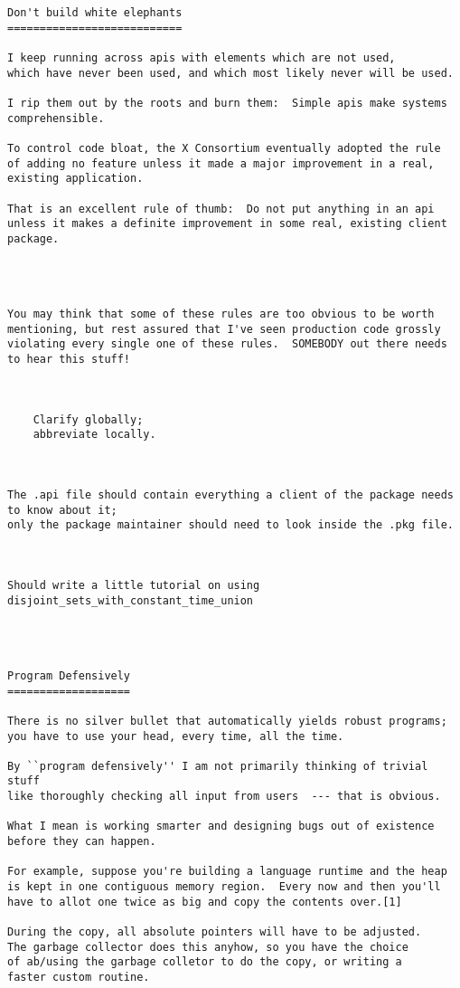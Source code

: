 \begin{verbatim}
Don't build white elephants 
=========================== 

I keep running across apis with elements which are not used, 
which have never been used, and which most likely never will be used. 

I rip them out by the roots and burn them:  Simple apis make systems comprehensible. 

To control code bloat, the X Consortium eventually adopted the rule 
of adding no feature unless it made a major improvement in a real, 
existing application. 

That is an excellent rule of thumb:  Do not put anything in an api 
unless it makes a definite improvement in some real, existing client 
package. 




You may think that some of these rules are too obvious to be worth 
mentioning, but rest assured that I've seen production code grossly 
violating every single one of these rules.  SOMEBODY out there needs 
to hear this stuff! 



    Clarify globally; 
    abbreviate locally. 



The .api file should contain everything a client of the package needs to know about it; 
only the package maintainer should need to look inside the .pkg file. 



Should write a little tutorial on using disjoint_sets_with_constant_time_union 




Program Defensively 
=================== 

There is no silver bullet that automatically yields robust programs; 
you have to use your head, every time, all the time. 

By ``program defensively'' I am not primarily thinking of trivial stuff 
like thoroughly checking all input from users  --- that is obvious. 

What I mean is working smarter and designing bugs out of existence 
before they can happen. 

For example, suppose you're building a language runtime and the heap 
is kept in one contiguous memory region.  Every now and then you'll 
have to allot one twice as big and copy the contents over.[1] 

During the copy, all absolute pointers will have to be adjusted. 
The garbage collector does this anyhow, so you have the choice 
of ab/using the garbage colletor to do the copy, or writing a 
faster custom routine. 


\end{verbatim}
